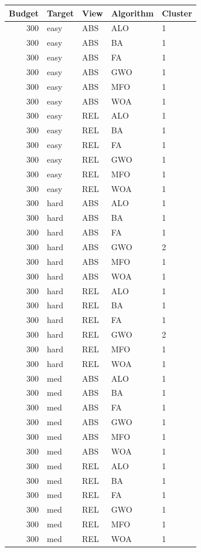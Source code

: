 \begin{tabular}{r l l l l}
\hline
Budget & Target & View & Algorithm & Cluster \\
\hline
300 & easy & ABS & ALO & 1 \\
300 & easy & ABS & BA & 1 \\
300 & easy & ABS & FA & 1 \\
300 & easy & ABS & GWO & 1 \\
300 & easy & ABS & MFO & 1 \\
300 & easy & ABS & WOA & 1 \\
300 & easy & REL & ALO & 1 \\
300 & easy & REL & BA & 1 \\
300 & easy & REL & FA & 1 \\
300 & easy & REL & GWO & 1 \\
300 & easy & REL & MFO & 1 \\
300 & easy & REL & WOA & 1 \\
300 & hard & ABS & ALO & 1 \\
300 & hard & ABS & BA & 1 \\
300 & hard & ABS & FA & 1 \\
300 & hard & ABS & GWO & 2 \\
300 & hard & ABS & MFO & 1 \\
300 & hard & ABS & WOA & 1 \\
300 & hard & REL & ALO & 1 \\
300 & hard & REL & BA & 1 \\
300 & hard & REL & FA & 1 \\
300 & hard & REL & GWO & 2 \\
300 & hard & REL & MFO & 1 \\
300 & hard & REL & WOA & 1 \\
300 & med & ABS & ALO & 1 \\
300 & med & ABS & BA & 1 \\
300 & med & ABS & FA & 1 \\
300 & med & ABS & GWO & 1 \\
300 & med & ABS & MFO & 1 \\
300 & med & ABS & WOA & 1 \\
300 & med & REL & ALO & 1 \\
300 & med & REL & BA & 1 \\
300 & med & REL & FA & 1 \\
300 & med & REL & GWO & 1 \\
300 & med & REL & MFO & 1 \\
300 & med & REL & WOA & 1 \\

\end{tabular}

